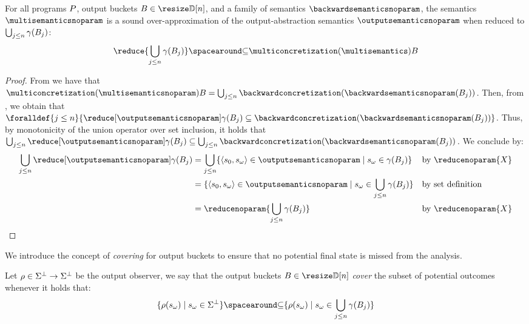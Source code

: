 \begin{lemma}
  For all programs $P$, output buckets $\buckets\in\vectorbuckets$, and a family of semantics $\backwardsemanticsnoparam$, the %
  semantics $\multisemanticsnoparam$ is a \textup{sound over-approximation} of the output-abstraction semantics $\outputsemanticsnoparam$ when reduced to $\bigcup_{j\le n}\gamma({B}_{j})$:
  \[\reduce{\bigsetjoin\limits_{j\le n}\abstractdomainconcretization(\bucket)} \SubseteQ \multiconcretization(\multisemantics)\buckets\]
\end{lemma}
\begin{proof}
  From  we have that $\multiconcretization(\multisemanticsnoparam)\buckets = \bigsetjoin_{j\le n}\backwardconcretization(\backwardsemanticsnoparam(\bucket))$.
  Then, from , we obtain that $\foralldef{j \le n}{\reducedoutputsemanticsnoparam \subseteq \backwardconcretization(\backwardsemanticsnoparam(\bucket))}$.
  Thus, by monotonicity of the union operator over set inclusion, it holds that $\bigsetjoin_{j\le n}\reducedoutputsemanticsnoparam \subseteq \bigsetjoin_{j\le n}\backwardconcretization(\backwardsemanticsnoparam(\bucket))$. We conclude by:
  \begin{align*}
    \bigsetjoin_{j\le n}\reducedoutputsemanticsnoparam &= \bigsetjoin_{j\le n} \setdef{\inputoutputtuple{\defstate}\in\outputsemanticsnoparam}{\retrieveoutput{\defstate}\in\abstractdomainconcretization(\bucket)}
      && \text{by $\reducenoparam{X}$} \\
    &= \setdef{\inputoutputtuple{\defstate}\in\outputsemanticsnoparam}{\retrieveoutput{\defstate}\in\bigsetjoin_{j \le n}\abstractdomainconcretization(\bucket)}
      && \text{by set definition} \\
    &= \reducenoparam{\bigsetjoin\limits_{j \le n}\abstractdomainconcretization(\bucket)}
      && \text{by $\reducenoparam{X}$}
  \end{align*}
  \end{proof}

We introduce the concept of \emph{covering} for output buckets to ensure that no potential final state is missed from the analysis.

\begin{definition}[Covering]\label{def:covering}
  Let $\rho\in\Sigma^\bot\to\Sigma^\bot$ be the output observer, we say that the output buckets $\buckets\in\vectorbuckets$ \textit{cover} the subset of potential outcomes whenever it holds that:
  \[
    \setdef{\outputobs(\retrieveoutput\defstate)}{\retrieveoutput{\defstate} \in \stateandbottom} \SubseteQ \setdef{\outputobs(\retrieveoutput\defstate)}{\retrieveoutput\defstate\in\bigsetjoin_{j\le n}\abstractdomainconcretization(\bucket)}
  \]
\end{definition}


